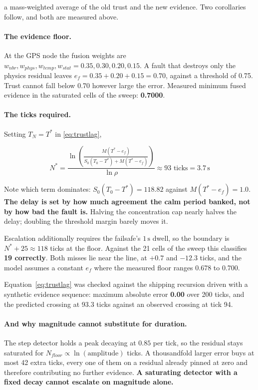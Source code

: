 \documentclass[11pt,a4paper]{article}
\begin{document}
a mass-weighted average of the old trust and the new evidence. Two corollaries
follow, and both are measured above.

\paragraph{The evidence floor.} At the GPS node the fusion weights are
$w_{nbr}, w_{phys}, w_{temp}, w_{stat} = 0.35, 0.30, 0.20, 0.15$. A fault that
destroys only the physics residual leaves
$e_f = 0.35 + 0.20 + 0.15 = 0.70$, against a threshold of 0.75. Trust cannot
fall below 0.70 however large the error. Measured minimum fused evidence in the
saturated cells of the sweep: \textbf{0.7000}.

\paragraph{The ticks required.} Setting $T_N = T^*$ in \eqref{eq:trustlag},

\begin{equation}
N^* = \frac{\ln \left( \frac{M(T^* - e_f)}{S_0(T_0 - T^*) + M(T^* - e_f)}
\right)}{\ln \rho} \approx 93 \text{ ticks} = 3.7\,\text{s}
\label{eq:nstar}
\end{equation}

Note which term dominates: $S_0(T_0 - T^*) = 118.82$ against
$M(T^* - e_f) = 1.0$. \textbf{The delay is set by how much agreement the calm
period banked, not by how bad the fault is.} Halving the concentration cap
nearly halves the delay; doubling the threshold margin barely moves it.

Escalation additionally requires the failsafe's $1\,\text{s}$ dwell, so the
boundary is $N^* + 25 \approx 118$ ticks at the floor. Against the 21 cells of
the sweep this classifies \textbf{19 correctly}. Both misses lie near the line,
at $+0.7$ and $-12.3$ ticks, and the model assumes a constant $e_f$ where the
measured floor ranges 0.678 to 0.700.

Equation~\eqref{eq:trustlag} was checked against the shipping recursion driven
with a synthetic evidence sequence: maximum absolute error \textbf{0.00} over
200 ticks, and the predicted crossing at 93.3 ticks against an observed
crossing at tick 94.

\paragraph{And why magnitude cannot substitute for duration.} The step detector
holds a peak decaying at $0.85$ per tick, so the residual stays saturated for
$N_{floor} \propto \ln(\text{amplitude})$ ticks. A thousandfold larger error
buys at most 42 extra ticks, every one of them on a residual already pinned at
zero and therefore contributing no further evidence. \textbf{A saturating
detector with a fixed decay cannot escalate on magnitude alone.}
\end{document}
